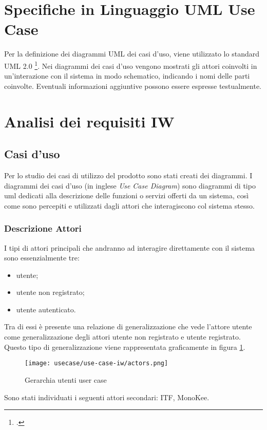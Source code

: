 \section{Specifiche in Linguaggio UML Use Case}
Per la definizione dei diagrammi UML dei casi d’uso, viene utilizzato lo standard UML 2.0 \footcite{site:uml}. Nei diagrammi dei casi d’uso vengono mostrati gli attori coinvolti in un’interazione con il sistema in modo schematico, indicando i nomi delle parti coinvolte. Eventuali informazioni aggiuntive possono essere espresse testualmente.

\section{Analisi dei requisiti IW}
\subsection{Casi d'uso}

Per lo studio dei casi di utilizzo del prodotto sono stati creati dei diagrammi.
I diagrammi dei casi d'uso (in inglese \emph{Use Case Diagram}) sono diagrammi di tipo \gls{uml} dedicati alla descrizione delle funzioni o servizi offerti da un sistema, così come sono percepiti e utilizzati dagli attori che interagiscono col sistema stesso.

\subsubsection{Descrizione Attori}
I tipi di attori principali che andranno ad interagire direttamente con il sistema sono essenzialmente tre: 
\begin{itemize}
    \item utente;
    \item utente non registrato;
    \item utente autenticato. 
\end{itemize}   
Tra di essi è presente una relazione di generalizzazione che vede l’attore utente come generalizzazione degli attori utente non registrato e utente registrato. Questo tipo di generalizzazione viene rappresentata graficamente in figura \ref{fig:ger-actors}.
\begin{figure}[!h]
    
    \centering
    \texttt{[image: usecase/use-case-iw/actors.png]} 
    \caption{Gerarchia utenti user case}
    \label{fig:ger-actors} 
\end{figure}
Sono stati individuati i seguenti attori secondari: ITF, MonoKee.

